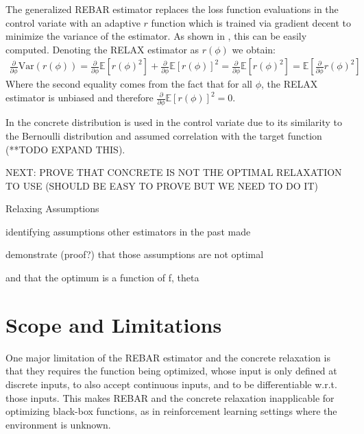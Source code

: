 \documentclass{article}
\newcommand{\relaxed}{r}
\newcommand{\var}{\text{Var}}
\begin{document}
The generalized REBAR estimator replaces the loss function evaluations in the control variate with an adaptive $\relaxed$ function which is trained via gradient decent to minimize the variance of the estimator. As shown in \cite{tucker2017rebar}, this can be easily computed. Denoting the RELAX estimator as $r(\phi)$ we obtain:
\begin{align}
    \frac{\partial}{\partial\phi}\var{(r(\phi))} = \frac{\partial}{\partial\phi}\mathbb{E}[r(\phi)^2] + \frac{\partial}{\partial\phi}\mathbb{E}[r(\phi)]^2 = \frac{\partial}{\partial\phi}\mathbb{E}[r(\phi)^2] = \mathbb{E}[\frac{\partial}{\partial\phi}r(\phi)^2]
\end{align}
Where the second equality comes from the fact that for all $\phi$, the RELAX estimator is unbiased and therefore $\frac{\partial}{\partial\phi}\mathbb{E}[r(\phi)]^2 = 0$.


In \cite{tucker2017rebar} the concrete distribution \cite{maddison2016concrete} is used in the control variate due to its similarity to the Bernoulli distribution and assumed correlation with the target function (**TODO EXPAND THIS).

NEXT: PROVE THAT CONCRETE IS NOT THE OPTIMAL RELAXATION TO USE (SHOULD BE EASY TO PROVE BUT WE NEED TO DO IT)



Relaxing Assumptions

identifying assumptions other estimators in the past made

demonstrate (proof?) that those assumptions are not optimal

and that the optimum is a function of {f, theta}


\section{Scope and Limitations}
\label{limitations}
One major limitation of the REBAR estimator and the concrete relaxation is that they requires the function being optimized, whose input is only defined at discrete inputs, to also accept continuous inputs, and to be differentiable w.r.t. those inputs.
This makes REBAR and the concrete relaxation inapplicable for optimizing black-box functions, as in reinforcement learning settings where the environment is unknown.
\end{document}
